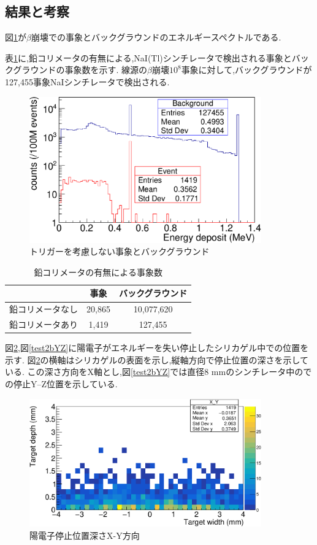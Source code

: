 \subsection{結果と考察}

図\ref{test2}が$\beta$崩壊での事象とバックグラウンドのエネルギースペクトルである.

表\ref{table_test2}に,鉛コリメータの有無による,NaI(Tl)シンチレータで検出される事象とバックグラウンドの事象数を示す.
線源の$\beta$崩壊$10^8$事象に対して,バックグラウンドが127,455事象NaIシンチレータで検出される.


\begin{figure}[htbp]
	\centering
		\includegraphics[width=10cm]{fig/test2.pdf}
	\caption{トリガーを考慮しない事象とバックグラウンド}
	\label{test2}
\end{figure}

\begin{table}[htbp]
	\centering
	\caption{鉛コリメータの有無による事象数}
		\label{table_test2}	
	  \begin{tabular}{ccc} 
		\hline
		   				&事象& バックグラウンド \\ 
		\hline \hline
		鉛コリメータなし & 20,865 & 10,077,620 \\
		鉛コリメータあり & 1,419  & 127,455   \\
		\hline
	  \end{tabular}
\end{table}

図\ref{test2bXY},図\ref{test2bYZ}に陽電子がエネルギーを失い停止したシリカゲル中での位置を示す.
図\ref{test2bXY}の横軸はシリカゲルの表面を示し,縦軸方向で停止位置の深さを示している.
この深さ方向をX軸とし,図\ref{test2bYZ}では直径8 mmのシンチレータ中のでの停止Y--Z位置を示している.

\begin{figure}[htbp]
	\centering
		\includegraphics[width=10cm]{fig/test2bXY.pdf}
	\caption{陽電子停止位置深さX-Y方向}
	\label{test2bXY}
\end{figure}

